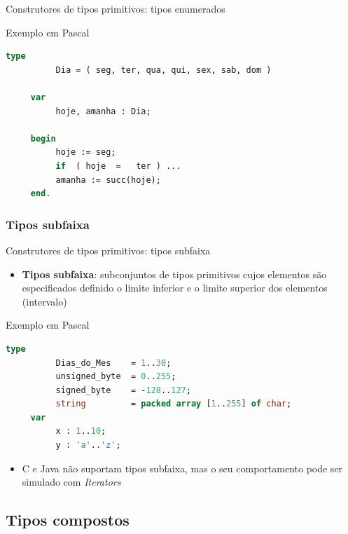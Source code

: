 \documentclass[handout]{beamer}
\begin{document}
\begin{frame}[fragile]{Construtores de tipos primitivos: tipos enumerados}
\begin{block}{Exemplo em Pascal}
	\begin{lstlisting}[language=Pascal,numbers=none]
     type
          Dia = ( seg, ter, qua, qui, sex, sab, dom )

     var
          hoje, amanha : Dia;

     begin
          hoje := seg;
          if  ( hoje  =   ter ) ...
          amanha := succ(hoje);
     end.
	\end{lstlisting}
\end{block}

\end{frame}


\subsubsection{Tipos subfaixa}

\begin{frame}[fragile]{Construtores de tipos primitivos: tipos subfaixa}
   \begin{itemize}
			\item \textbf{Tipos subfaixa}: subconjuntos de tipos primitivos cujos elementos são especificados
			definido o limite inferior e o limite superior dos elementos (intervalo)
	\end{itemize}

\begin{block}{Exemplo em Pascal}
	\begin{lstlisting}[language=Pascal,numbers=none]
     type
          Dias_do_Mes    = 1..30;
          unsigned_byte  = 0..255;
          signed_byte    = -128..127;
          string         = packed array [1..255] of char;
     var
          x : 1..10;
          y : 'a'..'z';
	\end{lstlisting}
\end{block}

   \begin{itemize}
			\item C e Java não suportam tipos subfaixa, mas o seu comportamento pode ser simulado com \textit{Iterators}
	\end{itemize}

\end{frame}


\subsection{Tipos compostos}
\end{document}
